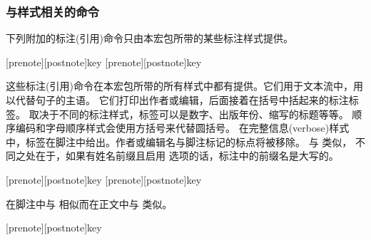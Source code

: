 \subsubsection{与样式相关的命令}%
\label{use:cit:cbx}

下列附加的标注(引用)命令只由本宏包所带的某些标注样式提供。

\begin{ltxsyntax}

[prenote][postnote]{key}
[prenote][postnote]{key}

这些标注(引用)命令在本宏包所带的所有样式中都有提供。它们用于文本流中，用以代替句子的主语。
它们打印出作者或编辑，后面接着在括号中括起来的标注标签。
取决于不同的标注样式，标签可以是数字、出版年份、缩写的标题等等。
顺序编码和字母顺序样式会使用方括号来代替圆括号。
在完整信息(verbose)样式中，标签在脚注中给出。作者或编辑名与脚注标记的标点将被移除。
 与  类似，
不同之处在于，如果有姓名前缀且启用  选项的话，标注中的前缀名是大写的。

[prenote][postnote]{key}
[prenote][postnote]{key}

在脚注中与  相似而在正文中与  类似。

[prenote][postnote]{key}


\end{ltxsyntax}
